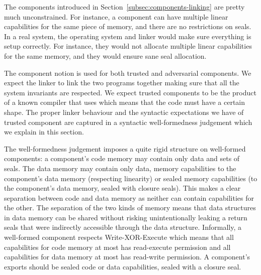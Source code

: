 \documentclass[acmsmall,screen]{acmart}\settopmatter{}
\newenvironment{jversion}%
    {\color{OliveGreen}}{}
\begin{document}
\begin{jversion}
  The components introduced in Section~\ref{subsec:components-linking} are pretty much unconstrained.
  For instance, a component can have multiple linear capabilities for the same piece of memory, and there are no restrictions on seals.
  In a real system, the operating system and linker  %
  would make sure everything is setup correctly.
  For instance, they would not allocate multiple linear capabilities for the same memory, and they would ensure sane seal allocation.

  The component notion is used for both trusted and adversarial components.
  We expect the linker to link the two programs together making sure that all the system invariants are respected.
  We expect trusted components to be the product of a known compiler that uses \stktokens{} which means that the code must have a certain shape.
  The proper linker behaviour and the syntactic expectations we have of trusted component are captured in a syntactic well-formedness judgement which we explain in this section.

  The well-formedness judgement imposes a quite rigid structure on well-formed components: a component's code memory may contain only data and sets of seals.
  The data memory may contain only data, memory capabilities to the component's data memory (respecting linearity) or sealed memory capabilities (to the component's data memory, sealed with closure seals).
  This makes a clear separation between code and data memory as neither can contain capabilities for the other.
  The separation of the two kinds of memory means that data structures in data memory can be shared without risking unintentionally leaking a return seals that were indirectly accessible through the data structure.
  Informally, a well-formed component respects Write-XOR-Execute which means that all capabilities for code memory at most has read-execute permission and all capabilities for data memory at most has read-write permission.
  A component's exports should be sealed code or data capabilities, sealed with a closure seal.


\end{jversion}
\end{document}
